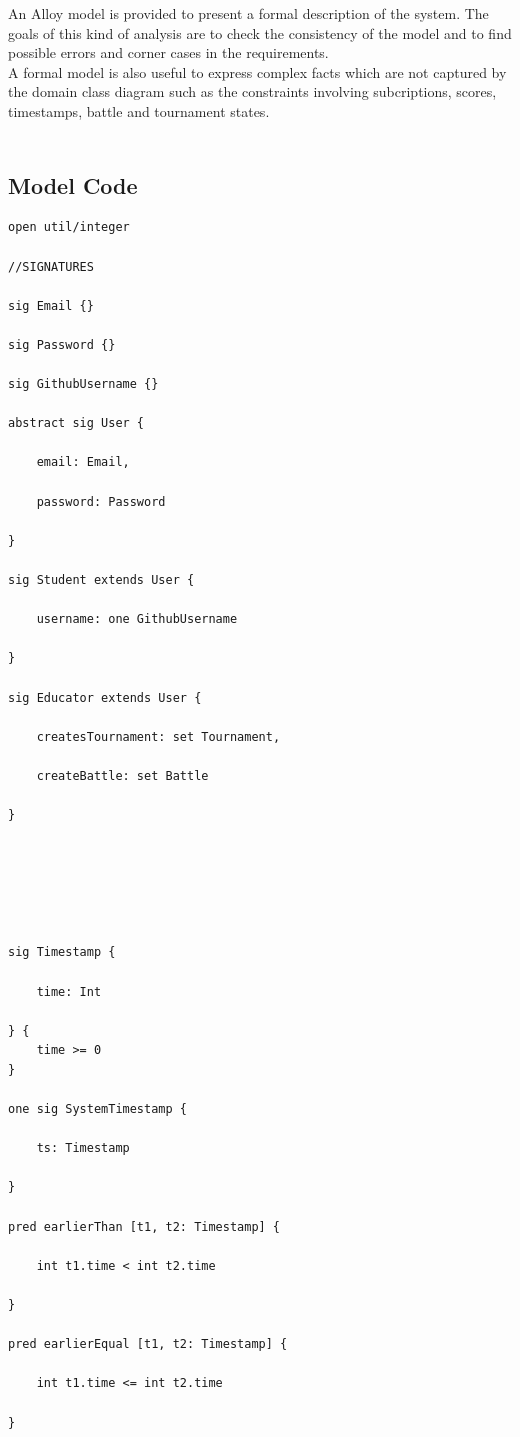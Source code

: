 An Alloy model is provided to present a formal description of the system. 
The goals of this kind of analysis are to check the consistency of the model and to find possible errors and corner cases in the requirements.\\
A formal model is also useful to express complex facts which are not captured by the domain class diagram such as the constraints involving subcriptions, scores, timestamps, battle and tournament states.\\ \\

\subsection{Model Code}
\begin{lstlisting}[language=alloy]
open util/integer

//SIGNATURES

sig Email {}

sig Password {}

sig GithubUsername {}

abstract sig User {

    email: Email,

    password: Password

}

sig Student extends User {

    username: one GithubUsername

}

sig Educator extends User {

    createsTournament: set Tournament,

    createBattle: set Battle

}






sig Timestamp {

    time: Int

} { 
    time >= 0 
}

one sig SystemTimestamp {

    ts: Timestamp

}

pred earlierThan [t1, t2: Timestamp] {

    int t1.time < int t2.time

}

pred earlierEqual [t1, t2: Timestamp] {

    int t1.time <= int t2.time

}


\end{lstlisting}
